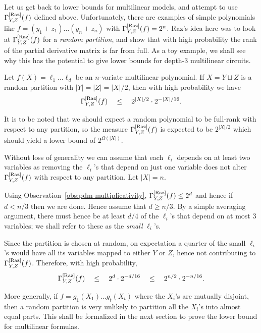 Let us get back to lower bounds for multilinear models, and attempt to use $\Gamma^{\mathrm{[Raz]}}_{Y,Z}(f)$ defined above. Unfortunately, there are examples of simple polynomials like $f = (y_1 + z_1)\dots (y_n + z_n)$ with $\Gamma^{\mathrm{[Raz]}}_{Y,Z}(f) = 2^n$. Raz's idea here was to look at $\Gamma^{\mathrm{[Raz]}}_{Y,Z}(f)$ for a \emph{random partition}, and show that with high probability the rank of the partial derivative matrix is far from full. As a toy example, we shall see why this has the potential to give lower bounds for depth-$3$ multilinear circuits. 

\begin{lemma}
Let $f(X) = \ell_1 \dots \ell_d$ be an $n$-variate multilinear polynomial. If $X = Y\sqcup Z$ is a random partition with $|Y| = |Z| = |X|/2$, then with high probability we have
$$
\Gamma^{\mathrm{[Raz]}}_{Y,Z}(f) \quad \leq \quad 2^{|X|/2} \cdot 2^{-|X|/16}.
$$
\end{lemma}

It is to be noted that we should expect a random polynomial to be full-rank with respect to any partition, so the measure $\Gamma^{\mathrm{[Raz]}}_{Y,Z}(f)$ is expected to be $2^{|X|/2}$ which should yield a lower bound of $2^{\Omega(|X|)}$. 

\begin{proof-sketch}
Without loss of generality we can assume that each $\ell_i$ depends on at least two variables as removing the $\ell_i$'s that depend on just one variable does not alter $\Gamma^{\mathrm{[Raz]}}_{Y,Z}(f)$ with respect to any partition. Let $|X| = n$. 

Using Observation~\ref{obs:pdm-multiplicativity}, $\Gamma^{\mathrm{[Raz]}}_{Y,Z}(f) \leq 2^d$ and hence if $d < n/3$ then we are done. Hence assume that $d \geq n/3$. By a simple averaging argument, there must hence be at least $d/4$ of the $\ell_i$'s that depend on at most $3$ variables; we shall refer to these as the \emph{small} $\ell_i$'s. 

Since the partition is chosen at random, on expectation a quarter of the small $\ell_i$'s would have all its variables mapped to either $Y$ or $Z$, hence not contributing to $\Gamma^{\mathrm{[Raz]}}_{Y,Z}(f)$. Therefore, with high probability,
$$
\Gamma^{\mathrm{[Raz]}}_{Y,Z}(f) \quad \leq \quad 2^{d} \cdot 2^{-d/16} \quad \leq \quad 2^{n/2} \cdot 2^{-n/16}.
$$
\end{proof-sketch}

More generally, if $f = g_1(X_1)\dots g_t(X_t)$ where the $X_i$'s are mutually disjoint, then a random partition is very unlikely to partition all the $X_i$'s into almost equal parts. This shall be formalized in the next section to prove the lower bound for multilinear formulas. 

